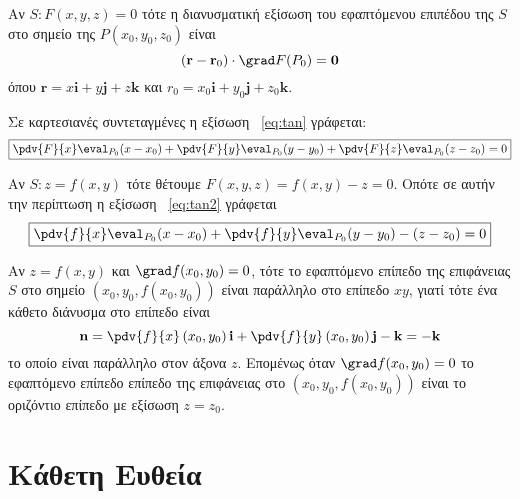 \begin{myitemize}
  \item Αν $S: F(x,y,z)=0$ τότε η διανυσματική εξίσωση του εφαπτόμενου επιπέδου της $S$ 
    στο σημείο της $ P(x_{0}, y_{0}, z_{0}) $ είναι
    \begin{equation}\label{eq:tan}
      (\mathbf{r} - \mathbf{r}_{0})\cdot \grad F(P_{0})= \mathbf{0} 
    \end{equation} 
    όπου $ \mathbf{r}=x \mathbf{i}+y \mathbf{j}+z \mathbf{k} $ και 
    $ r_{0}=x_{0} \mathbf{i}+ y _{0} \mathbf{j}+ z_{0} \mathbf{k} $.

    Σε καρτεσιανές συντεταγμένες η εξίσωση ~\eqref{eq:tan} γράφεται:
    \begin{equation}\label{eq:tan2}
      \boxed{		
        \pdv{F}{x}\eval_{P_{0}} (x-x_{0}) + \pdv{F}{y}\eval_{P_{0}} (y-y_{0}) +
        \pdv{F}{z}\eval_{P_{0}} (z-z_{0}) =0 
      } 
    \end{equation}

  \item Αν $ S: z=f(x,y) $ τότε θέτουμε $ F(x,y,z) =  f(x,y) - z = 0 $. Οπότε σε
    αυτήν την περίπτωση η εξίσωση ~\eqref{eq:tan2} γράφεται
    \[
      \boxed{
        \pdv{f}{x}\eval_{P_{0}} (x - x_{0}) + 
        \pdv{f}{y}\eval_{P_{0}} (y - y_{0}) - (z - z_{0}) = 0 
      }
    \] 
\end{myitemize}

\begin{rem}
  Αν $ z=f(x,y) $ και $ \grad f(x_{0}, y_{0}) = 0 $, τότε το εφαπτόμενο επίπεδο 
  της επιφάνειας $S$ στο σημείο $ (x_{0}, y_{0}, f(x_{0}, y_{0})) $ είναι 
  παράλληλο στο επίπεδο $ xy $, γιατί τότε ένα κάθετο διάνυσμα στο επίπεδο είναι 
  \[
    \mathbf{n} = \pdv{f}{x} \left(x_{0}, y_{0}\right)  \mathbf{i} + 
    \pdv{f}{y} \left(x_{0}, y_{0}\right) \mathbf{j} - \mathbf{k} = - \mathbf{k}
  \] 
  το οποίο είναι παράλληλο στον άξονα $z$. Επομένως όταν 
  $ \grad f(x_{0}, y_{0}) = 0 $ το εφαπτόμενο επίπεδο επίπεδο της επιφάνειας στο 
  $ (x_{0}, y_{0}, f(x_{0}, y_{0})) $ είναι το οριζόντιο επίπεδο με εξίσωση 
  $ z = z_{0} $.
\end{rem}


\section{Κάθετη Ευθεία}

